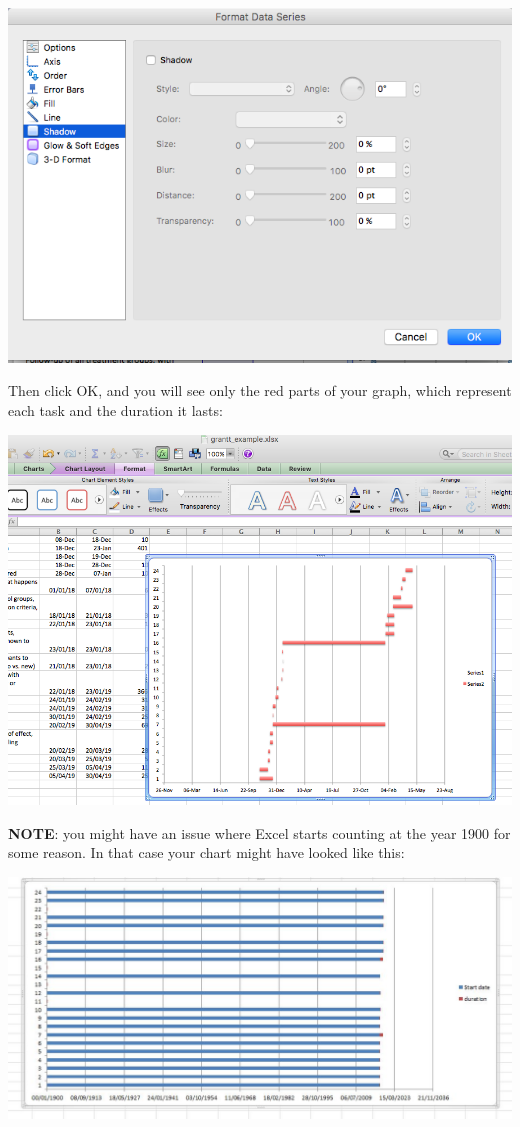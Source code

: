\documentclass[
]{book}
\begin{document}
\includegraphics{imgs/gantt_no_snadow.png}

Then click OK, and you will see only the red parts of your graph, which represent each task and the duration it lasts:

\includegraphics{imgs/gantt_blue_cleared.png}

\textbf{NOTE}: you might have an issue where Excel starts counting at the year 1900 for some reason. In that case your chart might have looked like this:

\includegraphics{imgs/1900_chart_default.jpg}
\end{document}
